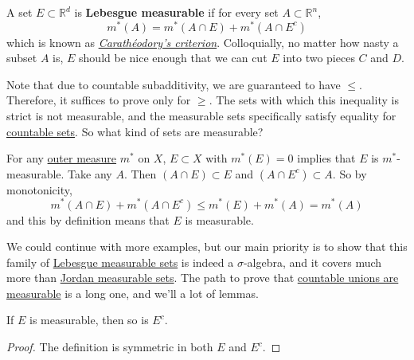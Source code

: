   \begin{definition}
    \label{def:lebesgue-measurable-set}
    A set $E \subset \mathbb{R}^d$ is \textbf{Lebesgue measurable} if for every set $A \subset \mathbb{R}^n$, 
    \begin{equation}
      m^\ast (A) = m^\ast (A \cap E) + m^\ast (A \cap E^c)
    \end{equation}
    which is known as \textit{\hyperref[def:caratheodorys-criterion]{Carathéodory's criterion}}. Colloquially, no matter how nasty a subset $A$ is, $E$ should be nice enough that we can cut $E$ into two pieces $C$ and $D$.
  \end{definition}

  Note that due to countable subadditivity, we are guaranteed to have $\leq$. Therefore, it suffices to prove only for $\geq$. The sets with which this inequality is strict is not measurable, and the measurable sets specifically satisfy equality for \hyperref[st-def:countable]{countable sets}. So what kind of sets are measurable? 

  \begin{example}
    \label{ex:outer-measure-0-sets-are-lebesgue-measurable}
    For any \hyperref[def:outer-measure]{outer measure} $m^\ast$ on $X$, $E \subset X$ with $m^\ast (E) = 0$  implies that $E$ is $m^\ast$-measurable. Take any $A$. Then $(A \cap E) \subset E$ and $(A \cap E^c) \subset A$. So by monotonicity, 
    \begin{equation}
      m^\ast(A \cap E) + m^\ast (A \cap E^c) \leq m^\ast(E) + m^\ast(A) = m^\ast (A)
    \end{equation}
    and this by definition means that $E$ is measurable. 
  \end{example}

  We could continue with more examples, but our main priority is to show that this family of \hyperref[def:lebesgue-measurable-set]{Lebesgue measurable sets} is indeed a $\sigma$-algebra, and it covers much more than \hyperref[def:jordan-measurable-set-jordan-measure]{Jordan measurable sets}. The path to prove that \hyperref[thm:countable-unions-are-measurable]{countable unions are measurable} is a long one, and we'll a lot of lemmas. 

  \begin{lemma}
    \label{thm:complements-of-measurable-sets-are-measurable}
    If $E$ is measurable, then so is $E^c$. 
  \end{lemma}
  \begin{proof}
    The definition is symmetric in both $E$ and $E^c$. 
  \end{proof}

